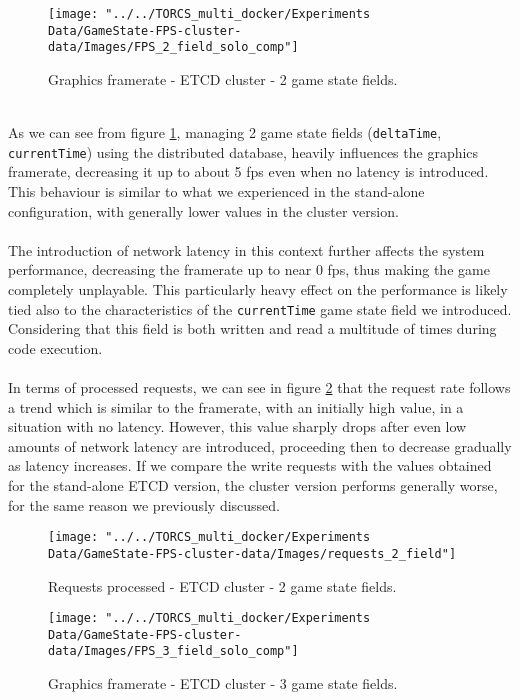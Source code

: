 \begin{figure}[h!]
	\centering
	\texttt{[image: "../../TORCS\_multi\_docker/Experiments Data/GameState-FPS-cluster-data/Images/FPS\_2\_field\_solo\_comp"]}
	\caption[Graphics framerate - ETCD cluster - 2 game state fields]{Graphics framerate - ETCD cluster - 2 game state fields.}
	\label{fig:fps-2-field-etcd-cluster}
\end{figure}
\\ As we can see from figure \ref{fig:fps-2-field-etcd-cluster}, managing 2 game state fields (\texttt{deltaTime}, \texttt{currentTime}) using the distributed database, heavily influences the graphics framerate, decreasing it up to about 5 fps even when no latency is introduced. This behaviour is similar to what we experienced in the stand-alone configuration, with generally lower values in the cluster version. \\ \\
The introduction of network latency in this context further affects the system performance, decreasing the framerate up to near 0 fps, thus making the game completely unplayable. This particularly heavy effect on the performance is likely tied also to the characteristics of the \texttt{currentTime} game state field we introduced. Considering that this field is both written and read a multitude of times during code execution. \\ \\
In terms of processed requests, we can see in figure \ref{fig:requests-2-field-etcd-cluster} that the request rate follows a trend which is similar to the framerate, with an initially high value, in a situation with no latency. However, this value sharply drops after even low amounts of network latency are introduced, proceeding then to decrease gradually as latency increases. If we compare the write requests with the values obtained for the stand-alone ETCD version, the cluster version performs generally worse, for the same reason we previously discussed. \\
\begin{figure}[h!]
	\centering
	\texttt{[image: "../../TORCS\_multi\_docker/Experiments Data/GameState-FPS-cluster-data/Images/requests\_2\_field"]}
	\caption[Requests processed - ETCD cluster - 2 game state fields]{Requests processed - ETCD cluster - 2 game state fields.}
	\label{fig:requests-2-field-etcd-cluster}
\end{figure}
\begin{figure}[h!]
	\centering
	\texttt{[image: "../../TORCS\_multi\_docker/Experiments Data/GameState-FPS-cluster-data/Images/FPS\_3\_field\_solo\_comp"]}
	\caption[Graphics framerate - ETCD cluster - 3 game state fields]{Graphics framerate - ETCD cluster - 3 game state fields.}
	\label{fig:fps-3-field-etcd-cluster}
\end{figure}
